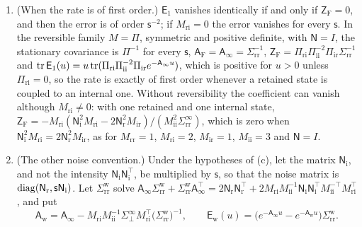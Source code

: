 \begin{proposition}
\begin{enumerate}
\item[(d)] (When the rate is of first order.) $\mathsf E_1$ vanishes identically if and only if $\mathsf Z_{\mathrm F}=0$, and then the error is of order $\mathsf s^{-2}$; if $M_{\mathrm{ri}}=0$ the error vanishes for every $\mathsf s$. In the reversible family $M=\Pi$, symmetric and positive definite, with $\mathsf N=I$, the stationary covariance is $\Pi^{-1}$ for every $\mathsf s$, $\mathsf A_{\mathrm F}=\mathsf A_\infty=\Sigma_{\mathrm{rr}}^{-1}$, $\mathsf Z_{\mathrm F}=\Pi_{\mathrm{ri}}\Pi_{\mathrm{ii}}^{-2}\Pi_{\mathrm{ir}}\Sigma_{\mathrm{rr}}^{-1}$ and $\operatorname{tr}\mathsf E_1(u)=u\operatorname{tr}(\Pi_{\mathrm{ri}}\Pi_{\mathrm{ii}}^{-2}\Pi_{\mathrm{ir}}e^{-\mathsf A_\infty u})$, which is positive for $u>0$ unless $\Pi_{\mathrm{ri}}=0$, so the rate is exactly of first order whenever a retained state is coupled to an internal one. Without reversibility the coefficient can vanish although $M_{\mathrm{ri}}\ne0$: with one retained and one internal state, $\mathsf Z_{\mathrm F}=-M_{\mathrm{ri}}(\mathsf N_{\mathrm i}^2M_{\mathrm{ri}}-2\mathsf N_{\mathrm r}^2M_{\mathrm{ir}})/(M_{\mathrm{ii}}^2\Sigma^\infty_{\mathrm{rr}})$, which is zero when $\mathsf N_{\mathrm i}^2M_{\mathrm{ri}}=2\mathsf N_{\mathrm r}^2M_{\mathrm{ir}}$, as for $M_{\mathrm{rr}}=1$, $M_{\mathrm{ri}}=2$, $M_{\mathrm{ir}}=1$, $M_{\mathrm{ii}}=3$ and $\mathsf N=I$.
\item[(e)] (The other noise convention.) Under the hypotheses of (c), let the matrix $\mathsf N_{\mathrm i}$, and not the intensity $\mathsf N_{\mathrm i}\mathsf N_{\mathrm i}^\top$, be multiplied by $\mathsf s$, so that the noise matrix is $\operatorname{diag}(\mathsf N_{\mathrm r},\mathsf s\mathsf N_{\mathrm i})$. Let $\Sigma^{\mathrm w}_{\mathrm{rr}}$ solve $\mathsf A_\infty\Sigma^{\mathrm w}_{\mathrm{rr}}+\Sigma^{\mathrm w}_{\mathrm{rr}}\mathsf A_\infty^\top=2\mathsf N_{\mathrm r}\mathsf N_{\mathrm r}^\top+2M_{\mathrm{ri}}M_{\mathrm{ii}}^{-1}\mathsf N_{\mathrm i}\mathsf N_{\mathrm i}^\top M_{\mathrm{ii}}^{-\top}M_{\mathrm{ri}}^\top$, and put
\begin{equation}\label{eq:ren-adiabatic-other}
\mathsf A_{\mathrm w}=\mathsf A_\infty-M_{\mathrm{ri}}M_{\mathrm{ii}}^{-1}\Sigma^\infty_\perp M_{\mathrm{ri}}^\top\bigl(\Sigma^{\mathrm w}_{\mathrm{rr}}\bigr)^{-1},\qquad\mathsf E_{\mathrm w}(u)=\bigl(e^{-\mathsf A_\infty u}-e^{-\mathsf A_{\mathrm w}u}\bigr)\Sigma^{\mathrm w}_{\mathrm{rr}}.
\end{equation}

\end{enumerate}
\end{proposition}

